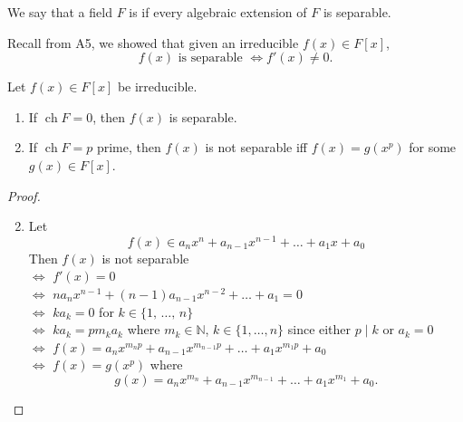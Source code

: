 \documentclass[notoc,notitlepage,nobib]{tufte-book}
\DeclareMathOperator{\ch}{ch}
\begin{document}
\begin{defn}\label{defn:perfect_fields}
  We say that a field $F$ is  if every algebraic extension of
  $F$ is separable.
\end{defn}

\begin{note}
  Recall from A5, we showed that given an irreducible $f(x) \in F[x]$,
  \begin{equation*}
    f(x) \text{ is separable } \iff f'(x) \neq 0.
  \end{equation*}
\end{note}

\begin{propo}\label{propo:separability_and_the_characteristic_of_a_field}
  Let $f(x) \in F[x]$ be irreducible.
  \begin{enumerate}
    \item If $\ch F = 0$, then $f(x)$ is separable. 
    \item If $\ch F = p$ prime, then $f(x)$ is not separable iff $f(x) = g(x^p)$
      for some $g(x) \in F[x]$.
  \end{enumerate}
\end{propo}

\begin{proof}
  \begin{enumerate}
    \setcounter{enumi}{1}
    \item Let
      \begin{equation*}
        f(x) \in a_n x^n + a_{n - 1} x^{n - 1} + \hdots + a_1 x + a_0
      \end{equation*}
      Then $f(x)$ is not separable \\
      $\iff$ $f'(x) = 0$ \\
      $\iff$ $na_n x^{n - 1} + (n - 1)a_{n - 1} x^{n - 2} + \hdots + a_1 = 0$
        \\
      $\iff$ $ka_k = 0$ for $k \in \{ 1, \, \ldots, \, n \}$ \\
      $\iff$ $ka_k = pm_k a_k$ where $m_k \in \mathbb{N}$, $k \in \{ 1, \ldots,
        n \}$ since either $p \mid k$ or $a_k = 0$ \\
      $\iff$ $f(x) = a_n x^{m_n p} + a_{n - 1}x^{m_{n - 1} p} + \hdots + a_1
        x^{m_1 p} + a_0$ \\
      $\iff$ $f(x) = g(x^p)$ where
      \begin{equation*}
        g(x) = a_n x^{m_n} + a_{n - 1} x^{m_{n - 1}} + \hdots + a_1 x^{m_1} +
        a_0.
      \end{equation*}
  \end{enumerate}
\end{proof}
\end{document}
